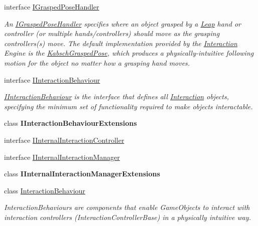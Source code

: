 \begin{DoxyCompactItemize}
interface \mbox{\hyperlink{interface_leap_1_1_unity_1_1_interaction_1_1_i_grasped_pose_handler}{I\+Grasped\+Pose\+Handler}}
\begin{DoxyCompactList}\small\item\em An \mbox{\hyperlink{interface_leap_1_1_unity_1_1_interaction_1_1_i_grasped_pose_handler}{I\+Grasped\+Pose\+Handler}} specifies where an object grasped by a \mbox{\hyperlink{namespace_leap_1_1_unity_1_1_leap}{Leap}} hand or controller (or multiple hands/controllers) should move as the grasping controllers(s) move. The default implementation provided by the \mbox{\hyperlink{namespace_leap_1_1_unity_1_1_interaction}{Interaction}} Engine is the \mbox{\hyperlink{class_leap_1_1_unity_1_1_interaction_1_1_kabsch_grasped_pose}{Kabsch\+Grasped\+Pose}}, which produces a physically-\/intuitive following motion for the object no matter how a grasping hand moves. \end{DoxyCompactList}\item 
interface \mbox{\hyperlink{interface_leap_1_1_unity_1_1_interaction_1_1_i_interaction_behaviour}{I\+Interaction\+Behaviour}}
\begin{DoxyCompactList}\small\item\em \mbox{\hyperlink{interface_leap_1_1_unity_1_1_interaction_1_1_i_interaction_behaviour}{I\+Interaction\+Behaviour}} is the interface that defines all \mbox{\hyperlink{namespace_leap_1_1_unity_1_1_interaction}{Interaction}} objects, specifying the minimum set of functionality required to make objects interactable. \end{DoxyCompactList}\item 
class {\bfseries I\+Interaction\+Behaviour\+Extensions}
\item 
interface \mbox{\hyperlink{interface_leap_1_1_unity_1_1_interaction_1_1_i_internal_interaction_controller}{I\+Internal\+Interaction\+Controller}}
\item 
interface \mbox{\hyperlink{interface_leap_1_1_unity_1_1_interaction_1_1_i_internal_interaction_manager}{I\+Internal\+Interaction\+Manager}}
\item 
class {\bfseries I\+Internal\+Interaction\+Manager\+Extensions}
\item 
class \mbox{\hyperlink{class_leap_1_1_unity_1_1_interaction_1_1_interaction_behaviour}{Interaction\+Behaviour}}
\begin{DoxyCompactList}\small\item\em Interaction\+Behaviours are components that enable Game\+Objects to interact with interaction controllers (Interaction\+Controller\+Base) in a physically intuitive way. \end{DoxyCompactList}\item 

\end{DoxyCompactItemize}
